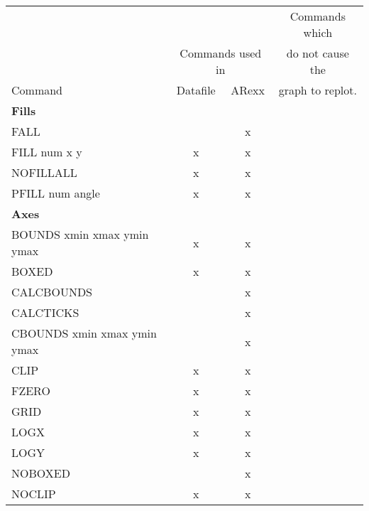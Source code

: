 \begin{center}
\scriptsize
\begin{tabular}{lccc} \hline
                                 &           &        & Commands which     \\
                                 & \multicolumn{2}{c}{Commands used in} %
                                                      & do not cause the   \\ \cline{2-3}
Command                          & Datafile  & ARexx  & graph to replot.   \\ \hline
{\bf Fills}                      &           &        &                    \\
FALL                             &           &     x  &                    \\
FILL  num   x   y                &     x     &     x  &                    \\
NOFILLALL                        &     x     &     x  &                    \\
PFILL  num   angle               &     x     &     x  &                    \\ \hline
{\bf Axes}                       &           &        &                    \\
BOUNDS xmin xmax ymin ymax       &     x     &     x  &                    \\
BOXED                            &     x     &     x  &                    \\
CALCBOUNDS                       &           &     x  &                    \\
CALCTICKS                        &           &     x  &                    \\
CBOUNDS xmin xmax ymin ymax      &           &     x  &                    \\
CLIP                             &     x     &     x  &                    \\
FZERO                            &     x     &     x  &                    \\
GRID                             &     x     &     x  &                    \\
LOGX                             &     x     &     x  &                    \\
LOGY                             &     x     &     x  &                    \\
NOBOXED                          &           &     x  &                    \\
NOCLIP                           &     x     &     x  &                    \\

\end{tabular}
\end{center}
